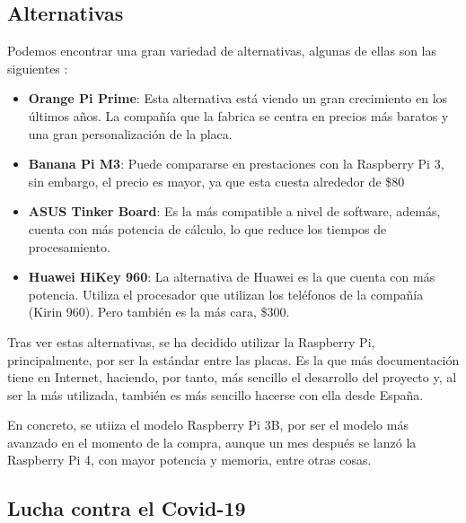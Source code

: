 
        \subsection{Alternativas} %
        \label{sub:AlternativasRaspberryPi}

            Podemos encontrar una gran variedad de alternativas, algunas de ellas son las
            siguientes \cite{alternativas_raspberry_pi}:

            \begin{itemize}
                \item \textbf{Orange Pi Prime}: Esta alternativa está viendo un gran crecimiento en los últimos años. La
                compañía que la fabrica se centra en precios más baratos y una gran personalización de la placa.
                \item \textbf{Banana Pi M3}: Puede compararse en prestaciones con la Raspberry Pi 3, sin embargo, el
                precio es mayor, ya que esta cuesta alrededor de \$80
                \item \textbf{ ASUS Tinker Board}: Es la más compatible a nivel de software, además, cuenta con más
                potencia de cálculo, lo que reduce los tiempos de procesamiento.
                \item \textbf{Huawei HiKey 960}: La alternativa de Huawei es la que cuenta con más potencia. Utiliza el
                procesador que utilizan los teléfonos de la compañía (Kirin 960). Pero también es la más cara, \$300.
            \end{itemize}

            Tras ver estas alternativas, se ha decidido utilizar la Raspberry Pi, principalmente, por ser la estándar
            entre las placas. Es la que más documentación tiene en Internet, haciendo, por tanto, más sencillo el
            desarrollo del proyecto y, al ser la más utilizada, también es más sencillo hacerse con ella desde
            España.

            En concreto, se utiiza el modelo Raspberry Pi 3B, por ser el modelo más avanzado en el momento de la compra,
            aunque un mes después se lanzó la Raspberry Pi 4, con mayor potencia y memoria, entre otras cosas.


        \subsection{Lucha contra el Covid-19} %
        \label{sub:LuchaContraElCovid-19}

